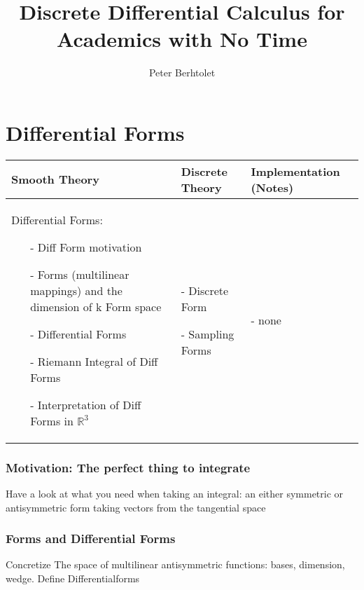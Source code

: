 \documentclass[]{scrbook}
\title{Discrete Differential Calculus for Academics with No Time}
\author{Peter Berhtolet}
\newenvironment{packed_enum}{
\begin{enumerate}
  \setlength{\itemsep}{1pt}
  \setlength{\parskip}{0pt}
  \setlength{\parsep}{0pt}
}{\end{enumerate}}
\begin{document}
	\maketitle
	\tableofcontents
	
	

	



\newpage
\chapter{Differential Forms}
	\begin{longtable}{|p{4.5cm}|p{4.5cm}|p{4.5cm}|}
		\hline
		Smooth Theory& Discrete Theory& Implementation (Notes)\\
		\hline
			Differential Forms: \begin{itemize}
			  \setlength{\itemsep}{1pt}
			  \setlength{\parskip}{0pt}
				\setlength{\parsep}{0pt}
				\item[-]Diff Form motivation
				\item[-]Forms (multilinear mappings) and the dimension of k Form space 
				\item[-]Differential Forms 
				\item[-]Riemann Integral of Diff Forms 
				\item[-]Interpretation of Diff Forms in $\mathbb R^3$ 
			\end{itemize}
			&
			\begin{packed_enum}
				\item[-] Discrete Form
				\item[-] Sampling Forms
			\end{packed_enum}
			 & - none
			 \\		
		\hline
	\end{longtable}
	\subsection{Motivation: The perfect thing to integrate}
		Have a look at what you need when taking an integral: an either symmetric or antisymmetric form taking
		vectors from the tangential space
	\subsection{Forms and Differential Forms}
		Concretize The space of multilinear antisymmetric functions: bases, dimension, wedge. Define Differentialforms
\end{document}
